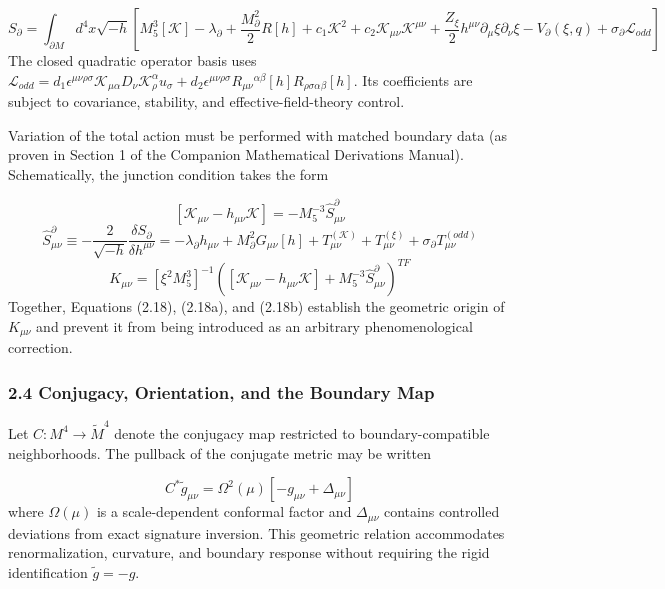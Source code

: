 \documentclass[aps,prd,onecolumn,superscriptaddress,nofootinbib,longbibliography,10pt]{revtex4-2}
\begin{document}
  \[ S_\partial = \int_{\partial M} d^4x \sqrt{-h} \left[ M_5^3 [\mathcal{K}] - \lambda_\partial + \frac{M_\partial^2}{2} R[h] + c_1 \mathcal{K}^2 + c_2 \mathcal{K}_{\mu\nu} \mathcal{K}^{\mu\nu} + \frac{Z_\xi}{2} h^{\mu\nu} \partial_\mu \xi \partial_\nu \xi - V_\partial(\xi, q) + \sigma_\partial \mathcal{L}_{odd} \right] \]
  The closed quadratic operator basis uses \(\mathcal{L}_{odd} = d_1 \epsilon^{\mu\nu\rho\sigma} \mathcal{K}_{\mu\alpha} D_\nu \mathcal{K}^\alpha_\rho u_\sigma + d_2 \epsilon^{\mu\nu\rho\sigma} R_{\mu\nu}{}^{\alpha\beta}[h] R_{\rho\sigma\alpha\beta}[h]\). Its coefficients are subject to covariance, stability, and effective-field-theory control.


  Variation of the total action must be performed with matched boundary data (as proven in Section 1 of the Companion Mathematical Derivations Manual). Schematically, the junction condition takes the form


  \[ [\mathcal{K}_{\mu\nu} - h_{\mu\nu}\mathcal{K}] = -M_5^{-3} \hat{S}^\partial_{\mu\nu} \]
  \[ \hat{S}^\partial_{\mu\nu} \equiv -\frac{2}{\sqrt{-h}} \frac{\delta S_\partial}{\delta h^{\mu\nu}} = -\lambda_\partial h_{\mu\nu} + M_\partial^2 G_{\mu\nu}[h] + T^{(\mathcal{K})}_{\mu\nu} + T^{(\xi)}_{\mu\nu} + \sigma_\partial T^{(odd)}_{\mu\nu} \]
  \[ K_{\mu\nu} = [\xi^2 M_5^3]^{-1} \left( [\mathcal{K}_{\mu\nu} - h_{\mu\nu}\mathcal{K}] + M_5^{-3} \hat{S}^\partial_{\mu\nu} \right)^{TF} \]
  Together, Equations (2.18), (2.18a), and (2.18b) establish the geometric origin of \(K_{\mu\nu}\) and prevent it from being introduced as an arbitrary phenomenological correction.



  
\subsubsection*{2.4 Conjugacy, Orientation, and the Boundary Map}

  Let \(C : M^4 \to \tilde{M}^4\) denote the conjugacy map restricted to boundary-compatible neighborhoods. The pullback of the conjugate metric may be written


  \[ C^* \tilde{g}_{\mu\nu} = \Omega^2(\mu) [-g_{\mu\nu} + \Delta_{\mu\nu}] \]
  where \(\Omega(\mu)\) is a scale-dependent conformal factor and \(\Delta_{\mu\nu}\) contains controlled deviations from exact signature inversion. This geometric relation accommodates renormalization, curvature, and boundary response without requiring the rigid identification \(\tilde{g} = -g\).
\end{document}
